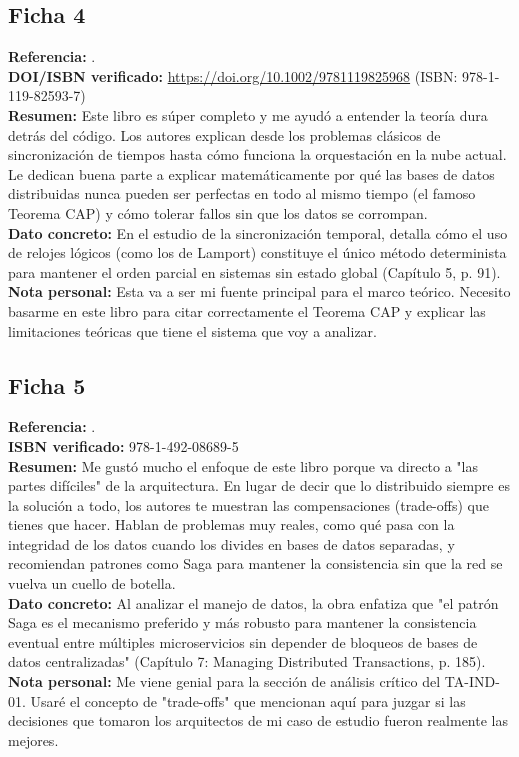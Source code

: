 \documentclass[12pt,a4paper]{article}
\begin{document}
\subsection*{Ficha 4}
\textbf{Referencia:} . \\
\textbf{DOI/ISBN verificado:} \url{https://doi.org/10.1002/9781119825968} (ISBN: 978-1-119-82593-7) \\
\textbf{Resumen:} Este libro es súper completo y me ayudó a entender la teoría dura detrás del código. Los autores explican desde los problemas clásicos de sincronización de tiempos hasta cómo funciona la orquestación en la nube actual. Le dedican buena parte a explicar matemáticamente por qué las bases de datos distribuidas nunca pueden ser perfectas en todo al mismo tiempo (el famoso Teorema CAP) y cómo tolerar fallos sin que los datos se corrompan. \\
\textbf{Dato concreto:} En el estudio de la sincronización temporal, detalla cómo el uso de relojes lógicos (como los de Lamport) constituye el único método determinista para mantener el orden parcial en sistemas sin estado global (Capítulo 5, p. 91). \\
\textbf{Nota personal:} Esta va a ser mi fuente principal para el marco teórico. Necesito basarme en este libro para citar correctamente el Teorema CAP y explicar las limitaciones teóricas que tiene el sistema que voy a analizar.

\subsection*{Ficha 5}
\textbf{Referencia:} . \\
\textbf{ISBN verificado:} 978-1-492-08689-5 \\
\textbf{Resumen:} Me gustó mucho el enfoque de este libro porque va directo a "las partes difíciles" de la arquitectura. En lugar de decir que lo distribuido siempre es la solución a todo, los autores te muestran las compensaciones (trade-offs) que tienes que hacer. Hablan de problemas muy reales, como qué pasa con la integridad de los datos cuando los divides en bases de datos separadas, y recomiendan patrones como Saga para mantener la consistencia sin que la red se vuelva un cuello de botella. \\
\textbf{Dato concreto:} Al analizar el manejo de datos, la obra enfatiza que "el patrón Saga es el mecanismo preferido y más robusto para mantener la consistencia eventual entre múltiples microservicios sin depender de bloqueos de bases de datos centralizadas" (Capítulo 7: Managing Distributed Transactions, p. 185). \\
\textbf{Nota personal:} Me viene genial para la sección de análisis crítico del TA-IND-01. Usaré el concepto de "trade-offs" que mencionan aquí para juzgar si las decisiones que tomaron los arquitectos de mi caso de estudio fueron realmente las mejores.

\printbibliography
\end{document}
